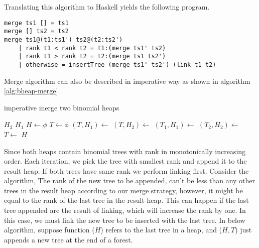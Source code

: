 \documentclass{article}
\begin{document}
Translating this algorithm to Haskell yields the following program.

\lstset{language=Haskell}
\begin{lstlisting}
merge ts1 [] = ts1
merge [] ts2 = ts2
merge ts1@(t1:ts1') ts2@(t2:ts2')
    | rank t1 < rank t2 = t1:(merge ts1' ts2)
    | rank t1 > rank t2 = t2:(merge ts1 ts2')
    | otherwise = insertTree (merge ts1' ts2') (link t1 t2)
\end{lstlisting}

Merge algorithm can also be described in imperative way as shown
in algorithm \ref{alg:bheap-merge}.

\begin{algorithm}
\caption{imperative merge two binomial heaps}
\label{alg:bheap-merge}
\begin{algorithmic}[1]
    \State \Return $H_2$
  \EndIf
    \State \Return $H_1$
  \EndIf
  \State $H \gets \phi$
    \State $T \gets \phi$
      \State $(T, H_1) \gets $ 
      \State $(T, H_2) \gets $ 
    \Else {}
      \State $(T_1, H_1) \gets $ 
      \State $(T_2, H_2) \gets $ 
      \State $T \gets $ 
    \EndIf
    \State {}
  \EndWhile
    \State {}
  \EndIf
    \State {}
  \EndIf
  \State \Return $H$
\EndFunction
\end{algorithmic}
\end{algorithm}

Since both heaps contain binomial trees with rank in monotonically
increasing order. Each iteration, we pick the tree with smallest
rank and append it to the result heap. If both trees have same rank
we perform linking first. Consider the  algorithm,
The rank of the new tree to be appended, can't be less than
any other trees in the result heap according to our merge strategy,
however, it might be equal to the rank of the last tree in the
result heap. This can happen if the last tree appended are the
result of linking, which will increase the rank by one. In this
case, we must link the new tree to be inserted with the last tree.
In below algorithm, suppose function ($H$) refers
to the last tree in a heap, and ($H, T$) just
appends a new tree at the end of a forest.
\end{document}
